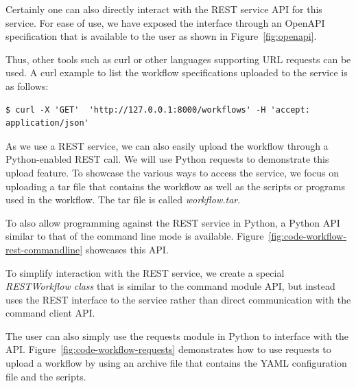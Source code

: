 Certainly one can also directly interact with the REST service API for
this service. For ease of use, we have exposed the interface through
an OpenAPI specification that is available to the user as shown in
Figure~\ref{fig:openapi}.

Thus, other tools such as curl or other languages supporting URL
requests can be used. A curl example to list the workflow
specifications uploaded to the service is as follows:

\begin{verbatim}
$ curl -X 'GET'  'http://127.0.0.1:8000/workflows' -H 'accept: application/json'
\end{verbatim}

As we use a REST service, we can also easily upload the workflow
through a Python-enabled REST call. We will use Python requests to
demonstrate this upload feature. To showcase the various ways to
access the service, we focus on uploading a tar file that contains the
workflow as well as the scripts or programs used in the workflow. The
tar file is called {\em workflow.tar}.

To also allow programming against the REST service in Python, a Python
API similar to that of the command line mode is
available. Figure~\ref{fig:code-workflow-rest-commandline} showcases
this API.

To simplify interaction with the REST service, we create a special
{\em RESTWorkflow class} that is similar to the command module API, but instead
uses the REST interface to the service rather than direct
communication with the command client API.

The user can also simply use the requests module in Python to
interface with the API. Figure~\ref{fig:code-workflow-requests}
demonstrates how to use requests to upload a workflow by using
an archive file that contains the YAML configuration file and the scripts.

